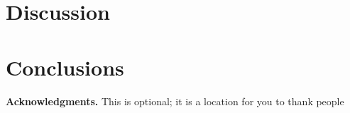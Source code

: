 \documentclass{mpaper}
\begin{document}
\section{Discussion}







\section{Conclusions}


\vskip8pt \noindent
{\bf Acknowledgments.}
This is optional; it is a location for you to thank people



\end{document}
